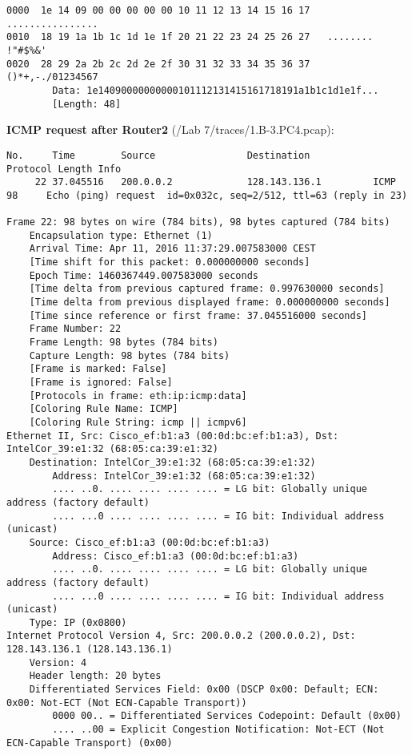 \begin{lstlisting}
0000  1e 14 09 00 00 00 00 00 10 11 12 13 14 15 16 17   ................
0010  18 19 1a 1b 1c 1d 1e 1f 20 21 22 23 24 25 26 27   ........ !"#$%&'
0020  28 29 2a 2b 2c 2d 2e 2f 30 31 32 33 34 35 36 37   ()*+,-./01234567
        Data: 1e14090000000000101112131415161718191a1b1c1d1e1f...
        [Length: 48]
\end{lstlisting}
        
        
\textbf{ICMP request after Router2} (/Lab 7/traces/1.B-3.PC4.pcap):
\begin{lstlisting}
No.     Time        Source                Destination           Protocol Length Info
     22 37.045516   200.0.0.2             128.143.136.1         ICMP     98     Echo (ping) request  id=0x032c, seq=2/512, ttl=63 (reply in 23)

Frame 22: 98 bytes on wire (784 bits), 98 bytes captured (784 bits)
    Encapsulation type: Ethernet (1)
    Arrival Time: Apr 11, 2016 11:37:29.007583000 CEST
    [Time shift for this packet: 0.000000000 seconds]
    Epoch Time: 1460367449.007583000 seconds
    [Time delta from previous captured frame: 0.997630000 seconds]
    [Time delta from previous displayed frame: 0.000000000 seconds]
    [Time since reference or first frame: 37.045516000 seconds]
    Frame Number: 22
    Frame Length: 98 bytes (784 bits)
    Capture Length: 98 bytes (784 bits)
    [Frame is marked: False]
    [Frame is ignored: False]
    [Protocols in frame: eth:ip:icmp:data]
    [Coloring Rule Name: ICMP]
    [Coloring Rule String: icmp || icmpv6]
Ethernet II, Src: Cisco_ef:b1:a3 (00:0d:bc:ef:b1:a3), Dst: IntelCor_39:e1:32 (68:05:ca:39:e1:32)
    Destination: IntelCor_39:e1:32 (68:05:ca:39:e1:32)
        Address: IntelCor_39:e1:32 (68:05:ca:39:e1:32)
        .... ..0. .... .... .... .... = LG bit: Globally unique address (factory default)
        .... ...0 .... .... .... .... = IG bit: Individual address (unicast)
    Source: Cisco_ef:b1:a3 (00:0d:bc:ef:b1:a3)
        Address: Cisco_ef:b1:a3 (00:0d:bc:ef:b1:a3)
        .... ..0. .... .... .... .... = LG bit: Globally unique address (factory default)
        .... ...0 .... .... .... .... = IG bit: Individual address (unicast)
    Type: IP (0x0800)
Internet Protocol Version 4, Src: 200.0.0.2 (200.0.0.2), Dst: 128.143.136.1 (128.143.136.1)
    Version: 4
    Header length: 20 bytes
    Differentiated Services Field: 0x00 (DSCP 0x00: Default; ECN: 0x00: Not-ECT (Not ECN-Capable Transport))
        0000 00.. = Differentiated Services Codepoint: Default (0x00)
        .... ..00 = Explicit Congestion Notification: Not-ECT (Not ECN-Capable Transport) (0x00)

\end{lstlisting}
